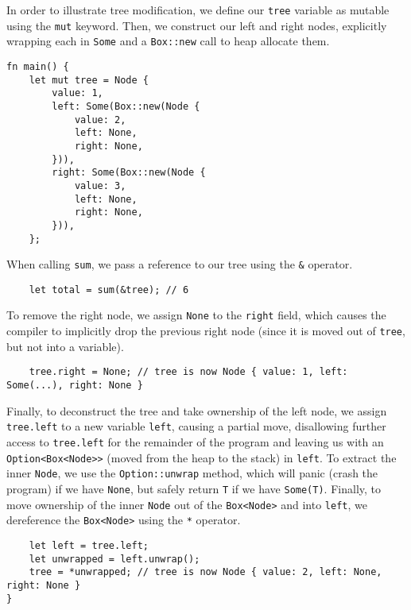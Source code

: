 \documentclass[12pt, letterpaper]{article}
\begin{document}
In order to illustrate tree modification, we define our \texttt{tree} variable as mutable using the \texttt{mut} keyword. Then, we construct our left and right nodes, explicitly wrapping each in \texttt{Some} and a \texttt{Box::new} call to heap allocate them.
\begin{verbatim}
fn main() {
    let mut tree = Node {
        value: 1,
        left: Some(Box::new(Node {
            value: 2,
            left: None,
            right: None,
        })),
        right: Some(Box::new(Node {
            value: 3,
            left: None,
            right: None,
        })),
    };
\end{verbatim}
When calling \texttt{sum}, we pass a reference to our tree using the \texttt{\&} operator.
\begin{verbatim}
    let total = sum(&tree); // 6
\end{verbatim}
To remove the right node, we assign \texttt{None} to the \texttt{right} field, which causes the compiler to implicitly drop the previous right node (since it is moved out of \texttt{tree}, but not into a variable).\autocite[\S 15.2.2]{rust-example}
\begin{verbatim}
    tree.right = None; // tree is now Node { value: 1, left: Some(...), right: None }
\end{verbatim}
Finally, to deconstruct the tree and take ownership of the left node, we assign \texttt{tree.left} to a new variable \texttt{left}, causing a partial move, disallowing further access to \texttt{tree.left} for the remainder of the program and leaving us with an \texttt{Option<Box<Node>>} (moved from the heap to the stack) in \texttt{left}. To extract the inner \texttt{Node}, we use the \texttt{Option::unwrap} method, which will panic (crash the program) if we have \texttt{None}, but safely return \texttt{T} if we have \texttt{Some(T)}.\autocite{rust-option} Finally, to move ownership of the inner \texttt{Node} out of the \texttt{Box<Node>} and into \texttt{left}, we dereference the \texttt{Box<Node>} using the \texttt{*} operator.\autocite{rust-boxed}
\begin{verbatim}
    let left = tree.left;
    let unwrapped = left.unwrap();
    tree = *unwrapped; // tree is now Node { value: 2, left: None, right: None }
}
\end{verbatim}
\end{document}
